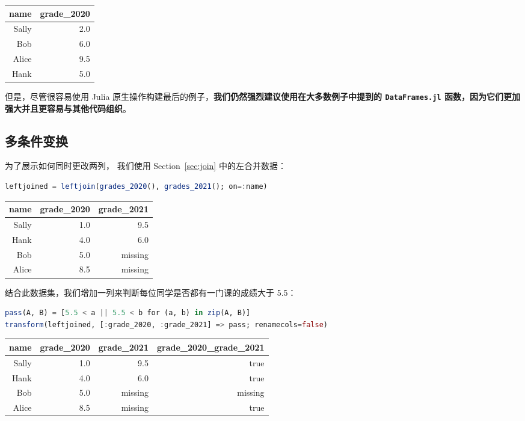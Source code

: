 \documentclass[
  notoc %
]{tufte-book}
\newcommand{\passthrough}[1]{#1}
\begin{document}
\begin{longtable}[]{@{}rr@{}}
\toprule
name & grade\_2020 \\
\midrule
\endhead
Sally & 2.0 \\
Bob & 6.0 \\
Alice & 9.5 \\
Hank & 5.0 \\
\bottomrule
\end{longtable}

但是，尽管很容易使用 Julia
原生操作构建最后的例子，\textbf{我们仍然强烈建议使用在大多数例子中提到的
\passthrough{\lstinline!DataFrames.jl!}
函数，因为它们更加强大并且更容易与其他代码组织}。

\hypertarget{sec:multiple_transform}{%
\subsection{多条件变换}\label{sec:multiple_transform}}

为了展示如何同时更改两列， 我们使用 Section~\ref{sec:join}
中的左合并数据：

\begin{lstlisting}[language=Julia]
leftjoined = leftjoin(grades_2020(), grades_2021(); on=:name)
\end{lstlisting}

\begin{longtable}[]{@{}rrr@{}}
\toprule
name & grade\_2020 & grade\_2021 \\
\midrule
\endhead
Sally & 1.0 & 9.5 \\
Hank & 4.0 & 6.0 \\
Bob & 5.0 & missing \\
Alice & 8.5 & missing \\
\bottomrule
\end{longtable}

结合此数据集，我们增加一列来判断每位同学是否都有一门课的成绩大于 5.5：

\begin{lstlisting}[language=Julia]
pass(A, B) = [5.5 < a || 5.5 < b for (a, b) in zip(A, B)]
transform(leftjoined, [:grade_2020, :grade_2021] => pass; renamecols=false)
\end{lstlisting}

\begin{longtable}[]{@{}rrrr@{}}
\toprule
name & grade\_2020 & grade\_2021 & grade\_2020\_grade\_2021 \\
\midrule
\endhead
Sally & 1.0 & 9.5 & true \\
Hank & 4.0 & 6.0 & true \\
Bob & 5.0 & missing & missing \\
Alice & 8.5 & missing & true \\
\bottomrule
\end{longtable}
\end{document}

